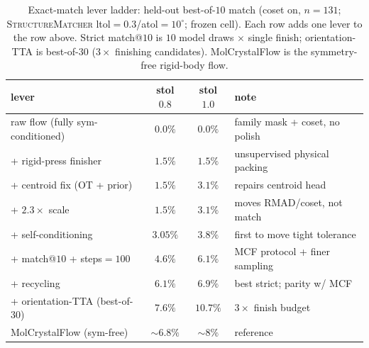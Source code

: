 \documentclass[journal=jcisd8,manuscript=article]{achemso}
\begin{document}
\begin{table}[t]\centering
\caption{Exact-match lever ladder: held-out best-of-$10$ match (coset on, $n{=}131$;
\textsc{StructureMatcher} ltol$=0.3$/atol$=10^\circ$; frozen cell). Each row adds
one lever to the row above. Strict match@$10$ is $10$ model draws $\times$ single
finish; orientation-TTA is best-of-$30$ ($3\times$ finishing candidates).
MolCrystalFlow is the symmetry-free rigid-body flow.}
\label{tab:ladder}
\begin{tabular}{lccl}\toprule
lever & stol $0.8$ & stol $1.0$ & note \\\midrule
raw flow (fully sym-conditioned)        & $0.0\%$ & $0.0\%$ & family mask + coset, no polish \\
\quad + rigid-press finisher            & $1.5\%$ & $1.5\%$ & unsupervised physical packing \\
\quad + centroid fix (OT + prior)       & $1.5\%$ & $3.1\%$ & repairs centroid head \\
\quad + $2.3\times$ scale               & $1.5\%$ & $3.1\%$ & moves RMAD/coset, not match \\
\quad + self-conditioning               & $3.05\%$& $3.8\%$ & first to move tight tolerance \\
\quad + match@$10$ + steps$=100$        & $4.6\%$ & $6.1\%$ & MCF protocol + finer sampling \\
\quad + recycling                       & $\mathbf{6.1\%}$ & $\mathbf{6.9\%}$ & best strict; parity w/ MCF \\
\quad + orientation-TTA (best-of-$30$)  & $7.6\%$ & $\mathbf{10.7\%}$ & $3\times$ finish budget \\\midrule
MolCrystalFlow (sym-free)\cite{zeng2026molcrystalflow} & $\sim\!6.8\%$ & $\sim\!8\%$ & reference \\
\bottomrule
\end{tabular}
\end{table}
\end{document}
